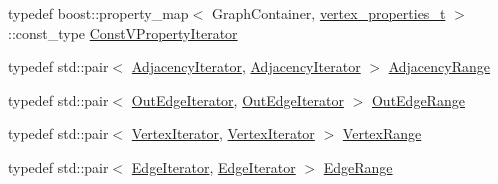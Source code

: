 \begin{DoxyCompactItemize}
\item 
typedef boost\+::property\+\_\+map$<$ Graph\+Container, \hyperlink{_graph_8h_ac353e55313080132b9a44c66de25ab8d}{vertex\+\_\+properties\+\_\+t} $>$\+::const\+\_\+type \hyperlink{classpan_1_1detail_1_1_graph_a4ae877190ca2507e8c2f557b5cdaf759}{Const\+V\+Property\+Iterator}
\item 
typedef std\+::pair$<$ \hyperlink{classpan_1_1detail_1_1_graph_a3cec4963078d7a19e05fbd038525ac17}{Adjacency\+Iterator}, \hyperlink{classpan_1_1detail_1_1_graph_a3cec4963078d7a19e05fbd038525ac17}{Adjacency\+Iterator} $>$ \hyperlink{classpan_1_1detail_1_1_graph_abcc5afe3ac75ffca9c7d845a1a2217a5}{Adjacency\+Range}
\item 
typedef std\+::pair$<$ \hyperlink{classpan_1_1detail_1_1_graph_ab020b117f26b3d19039491ecb5ff5130}{Out\+Edge\+Iterator}, \hyperlink{classpan_1_1detail_1_1_graph_ab020b117f26b3d19039491ecb5ff5130}{Out\+Edge\+Iterator} $>$ \hyperlink{classpan_1_1detail_1_1_graph_a6a455005d606a7ead0feba1c84156bc7}{Out\+Edge\+Range}
\item 
typedef std\+::pair$<$ \hyperlink{classpan_1_1detail_1_1_graph_a70f42d6ae8c952de395c7fe665182e5c}{Vertex\+Iterator}, \hyperlink{classpan_1_1detail_1_1_graph_a70f42d6ae8c952de395c7fe665182e5c}{Vertex\+Iterator} $>$ \hyperlink{classpan_1_1detail_1_1_graph_a5b49d7bed177c89e2a5d7cc59df1fb13}{Vertex\+Range}
\item 
typedef std\+::pair$<$ \hyperlink{classpan_1_1detail_1_1_graph_abf1033eeaf577f4c099f3e56164a0439}{Edge\+Iterator}, \hyperlink{classpan_1_1detail_1_1_graph_abf1033eeaf577f4c099f3e56164a0439}{Edge\+Iterator} $>$ \hyperlink{classpan_1_1detail_1_1_graph_af7c5ed956d483a3bf26469b7698f5689}{Edge\+Range}
\end{DoxyCompactItemize}
